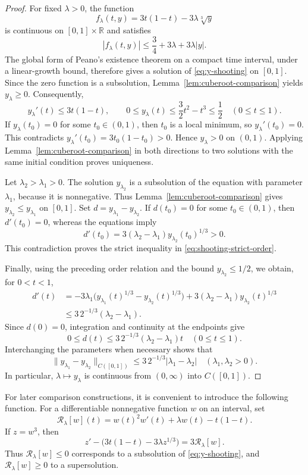 \documentclass[12pt]{amsart}
\numberwithin{equation}{section}
\theoremstyle{plain}
\theoremstyle{definition}
\begin{document}
\begin{proof}
For fixed
$\lambda>0$, the function
\[
  f_\lambda(t,y)=3t(1-t)-3\lambda\sqrt[3]{y}
\]
is continuous on $[0,1]\times\mathbb R$ and satisfies
\[
  |f_\lambda(t,y)|
  \le \frac34+3\lambda+3\lambda|y|.
\]
The global form of Peano's existence theorem on a compact time interval,
under a linear-growth bound, therefore gives a solution of \eqref{eq:y-shooting} on
$[0,1]$. Since the zero function is a subsolution, Lemma~\ref{lem:cuberoot-comparison} yields
$y_\lambda\ge0$. Consequently,
\[
  y_\lambda'(t)\le3t(1-t),\qquad
  0\le y_\lambda(t)\le\frac32t^2-t^3\le\frac12
  \quad(0\le t\le1).
\]
If $y_\lambda(t_0)=0$ for some $t_0\in(0,1)$, then $t_0$ is a local
minimum, so $y_\lambda'(t_0)=0$. This contradicts
$y_\lambda'(t_0)=3t_0(1-t_0)>0$. Hence $y_\lambda>0$ on $(0,1)$.
Applying Lemma~\ref{lem:cuberoot-comparison} in both directions to two solutions with the same
initial condition proves uniqueness.

Let $\lambda_2>\lambda_1>0$. The solution $y_{\lambda_2}$ is a
subsolution of the equation with parameter $\lambda_1$, because it is
nonnegative. Thus Lemma~\ref{lem:cuberoot-comparison} gives
$y_{\lambda_2}\le y_{\lambda_1}$ on $[0,1]$. Set
$d=y_{\lambda_1}-y_{\lambda_2}$. If $d(t_0)=0$ for some
$t_0\in(0,1)$, then $d'(t_0)=0$, whereas the equations imply
\[
  d'(t_0)
  =3(\lambda_2-\lambda_1)y_{\lambda_2}(t_0)^{1/3}>0.
\]
This contradiction proves the strict inequality in \eqref{eq:shooting-strict-order}.

Finally, using the preceding order relation and the bound
$y_{\lambda_2}\le1/2$, we obtain, for $0<t<1$,
\begin{align*}
  d'(t)
  &=-3\lambda_1\bigl(y_{\lambda_1}(t)^{1/3}
                    -y_{\lambda_2}(t)^{1/3}\bigr)
    +3(\lambda_2-\lambda_1)y_{\lambda_2}(t)^{1/3} \\
  &\le 3\,2^{-1/3}(\lambda_2-\lambda_1).
\end{align*}
Since $d(0)=0$, integration and continuity at the endpoints give
\[
  0\le d(t)\le 3\,2^{-1/3}(\lambda_2-\lambda_1)t
  \quad(0\le t\le1).
\]
Interchanging the parameters when necessary shows that
\[
  \|y_{\lambda_1}-y_{\lambda_2}\|_{C([0,1])}
  \le 3\,2^{-1/3}|\lambda_1-\lambda_2|
  \quad(\lambda_1,\lambda_2>0).
\]
In particular, $\lambda\mapsto y_\lambda$ is continuous from
$(0,\infty)$ into $C([0,1])$.
\end{proof}


For later comparison constructions, it is convenient to introduce the
following function.  For a differentiable nonnegative function $w$ on an interval, set
\[
 \mathcal R_\lambda[w](t)=w(t)^2w'(t)+\lambda w(t)-t(1-t).
\]
If \(z=w^3\), then
\[
 z'-\bigl(3t(1-t)-3\lambda z^{1/3}\bigr)=3\mathcal R_\lambda[w].
\]
Thus \(\mathcal R_\lambda[w]\le0\) corresponds to a subsolution of
\eqref{eq:y-shooting}, and \(\mathcal R_\lambda[w]\ge0\) to a supersolution.
\end{document}
